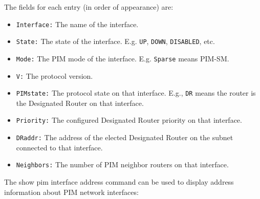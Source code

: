 The fields for each entry (in order of appearance) are:
\begin{itemize}

  \item {\tt Interface:} The name of the interface.

  \item {\tt State:} The state of the interface. E.g. {\tt UP}, {\tt DOWN},
  {\tt DISABLED}, etc.

  \item {\tt Mode:} The PIM mode of the interface. E.g. {\tt Sparse} means
  PIM-SM.

  \item {\tt V:} The protocol version.

  \item {\tt PIMstate:} The protocol state on that interface. E.g., {\tt DR}
  means the router is the Designated Router on that interface.

  \item {\tt Priority:} The configured Designated Router priority on that
  interface.

  \item {\tt DRaddr:} The address of the elected Designated Router on the
  subnet connected to that interface.

  \item {\tt Neighbors:} The number of PIM neighbor routers on that interface.

\end{itemize}

The {\stt show pim interface address} command can be used to display
address information about PIM network interfaces:

\vspace{0.1in}
\noindent{}
\vspace{0.1in}

